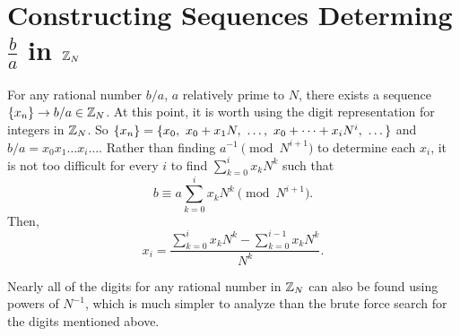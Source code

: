 \section{Constructing Sequences Determing $\frac{b}{a}$ in $\mathbb{Z}_N$}

\par For any rational number $b/a$, $a$ relatively prime to $N$, there
exists a sequence $\{x_n\} \rightarrow b/a \in \mathbb{Z}_N$. At this point, it is worth
using the digit representation for integers in $\mathbb{Z}_N$. So
$\xn=\{x_0, \ x_0+x_1N, \ \dots, \ x_0+\dots+x_iN^i, \ \dots\}$
and $b/a = x_0x_1\dots x_i\dots$. Rather than finding $a^{-1}\pmod N^{i+1}$ to
determine each $x_i$, it is not too difficult for every $i$ to find $\sum_{k=0}^ix_kN^k$
such that
\begin{equation}\label{eq:seq-rational}
  b \equiv a\sum_{k=0}^ix_kN^k \pmod{N^{i+1}}.
\end{equation}
Then, 
\begin{equation}
  x_i = \frac{\sum_{k=0}^ix_kN^k - \sum_{k=0}^{i-1}x_kN^k}{N^k}.
\end{equation}

\par Nearly all of the digits for any rational number in $\mathbb{Z}_N$ can also
be found using powers of $N^{-1}$, which is much simpler to analyze
than the brute force search for the digits mentioned above.

